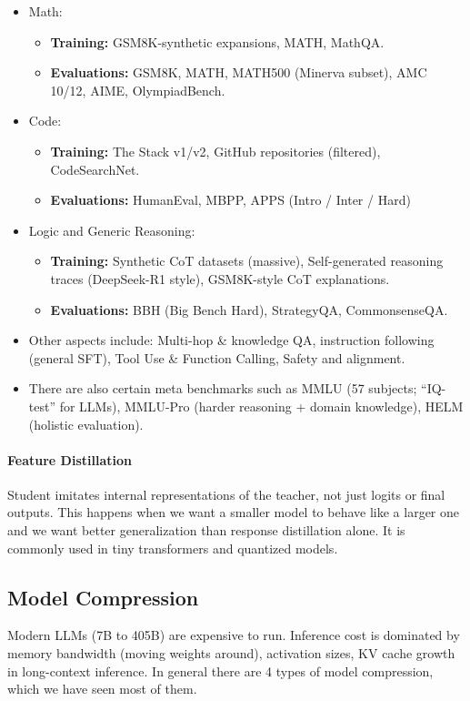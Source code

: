 \documentclass[11pt]{article}  %
\begin{document}
\begin{itemize}
  \item Math: 
  \begin{itemize}
    \item \textbf{Training:} GSM8K-synthetic expansions, MATH, MathQA.
    \item \textbf{Evaluations:} GSM8K, MATH, MATH500 (Minerva subset), AMC 10/12, AIME, OlympiadBench.
  \end{itemize}

  \item Code:
  \begin{itemize}
    \item \textbf{Training:} The Stack v1/v2, GitHub repositories (filtered), CodeSearchNet.
    \item \textbf{Evaluations:} HumanEval, MBPP, APPS (Intro / Inter / Hard)
  \end{itemize}

  \item Logic and Generic Reasoning:
  \begin{itemize}
    \item \textbf{Training:} Synthetic CoT datasets (massive), Self-generated reasoning traces (DeepSeek-R1 style), GSM8K-style CoT explanations.
    \item \textbf{Evaluations:} BBH (Big Bench Hard), StrategyQA, CommonsenseQA.
  \end{itemize}

  \item Other aspects include: Multi-hop \& knowledge QA, instruction following (general SFT), Tool Use \& Function Calling, Safety and alignment. 
  
  \item There are also certain meta benchmarks such as MMLU (57 subjects; ``IQ-test'' for LLMs), MMLU-Pro (harder reasoning + domain knowledge), HELM (holistic evaluation).
\end{itemize}


\paragraph{Feature Distillation}
Student imitates internal representations of the teacher, not just logits or final outputs.
This happens when we want a smaller model to behave like a larger one and we want better generalization than response distillation alone.
It is commonly used in tiny transformers and quantized models.


\subsection{Model Compression}
Modern LLMs (7B to 405B) are expensive to run. Inference cost is dominated by memory bandwidth (moving weights around), activation sizes, KV cache growth in long-context inference.
In general there are 4 types of model compression, which we have seen most of them.
\end{document}
